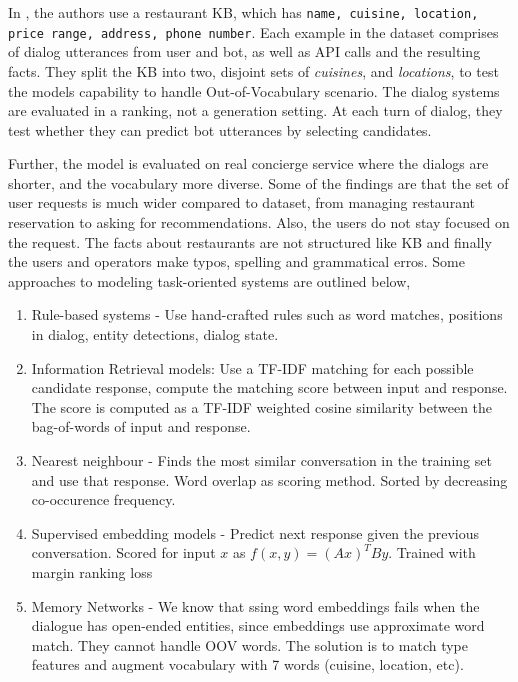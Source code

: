 \documentclass[12pt,a4paper]{article}
\begin{document}
In \cite{Bordes2016LearningEG}, the authors use a restaurant KB, which has \texttt{name, cuisine, location, price range, address, phone number}. Each example in the dataset comprises of dialog utterances from user and bot, as well as API calls and the resulting facts. They split the KB into two, disjoint sets of \textit{cuisines}, and \textit{locations}, to test the models capability to handle Out-of-Vocabulary scenario. The dialog systems are evaluated in a ranking, not a generation setting. At each turn of dialog, they test whether they can predict bot utterances by selecting candidates.

Further, the model is evaluated on real concierge service where the dialogs are shorter, and the vocabulary more diverse. Some of the findings are that the set of user requests is much wider compared to dataset, from managing restaurant reservation to asking for recommendations. Also, the users do not stay focused on the request. The facts about restaurants are not structured like KB and finally the users and operators make typos, spelling and grammatical erros. Some approaches to modeling task-oriented systems are outlined below,

\begin{enumerate}
  \item Rule-based systems - Use hand-crafted rules such as word matches, positions in dialog, entity detections, dialog state.
  \item Information Retrieval models: Use a TF-IDF matching for each possible candidate response, compute the matching score between input and response. The score is computed as a TF-IDF weighted cosine similarity between the bag-of-words of input and response.
  \item Nearest neighbour - Finds the most similar conversation in the training set and use that response. Word overlap as scoring method. Sorted by decreasing co-occurence frequency.
  \item Supervised embedding models - Predict next response given the previous conversation. Scored for input $x$ as $f(x, y) = (Ax)^TBy$. Trained with margin ranking loss
  \item Memory Networks - We know that ssing word embeddings fails when the dialogue has open-ended entities, since embeddings use approximate word match. They cannot handle OOV words. The solution is to match type features and augment vocabulary with 7 words (cuisine, location, etc).
\end{enumerate}
\end{document}
